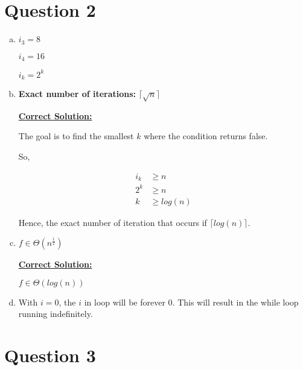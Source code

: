 \documentclass[12pt]{article}
\begin{document}
\section*{Question 2}
\begin{enumerate}[a.]
    \item

    $i_3 = 8$

    $i_4 = 16$

    $i_k = 2^k$

    \item

    \textbf{Exact number of iterations:} $\lceil \sqrt{n} \rceil$

    \bigskip

    \underline{\textbf{Correct Solution:}}

    The goal is to find the smallest $k$ where the condition returns false.

    \bigskip

    So,

    \begin{align}
        i_k &\geq n\\
        2^k &\geq n\\
        k &\geq log(n)
    \end{align}

    Hence, the exact number of iteration that occurs if $\lceil log(n) \rceil$.

    \item

    $f \in \Theta (n^{\frac{1}{2}})$

    \bigskip

    \underline{\textbf{Correct Solution:}}

    $f \in \Theta (log(n))$

    \item

    With $i = 0$, the $i$ in loop will be forever 0. This will result in the while
    loop running indefinitely.


\end{enumerate}

\section*{Question 3}
\end{document}
